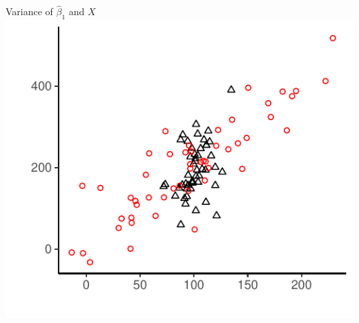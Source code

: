 \documentclass{./../div_teaching_slides}
\begin{document}
\begin{frame}{Variance of $\hat{\beta}_1$ and $X$}
\centering
\includegraphics{./../../output/lrm_variance.pdf}
\end{frame}


\end{document}
